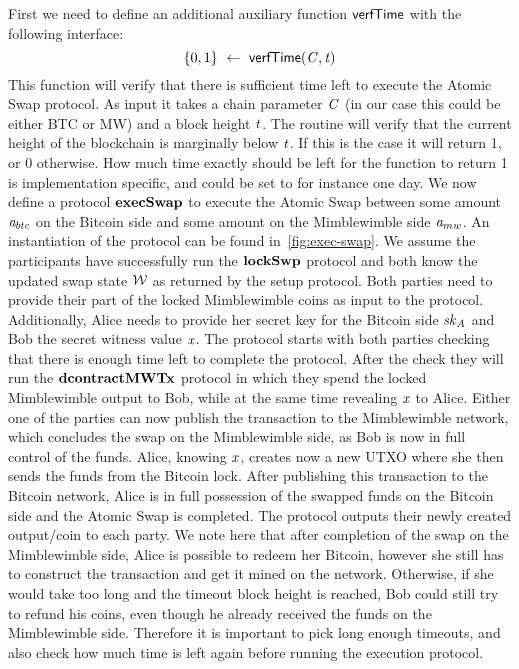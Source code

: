 First we need to define an additional auxiliary function $\mathsf{verfTime}$ with the following interface:
\[ \{0,1\} ~\leftarrow~ \mathsf{verfTime} (\mathit{C},\mathit{t}) \]
This function will verify that there is sufficient time left to execute the Atomic Swap protocol.
As input it takes a chain parameter $\mathit{C}$ (in our case this could be either BTC or MW) and a block height $\mathit{t}$.
The routine will verify that the current height of the blockchain is marginally below $\mathit{t}$.
If this is the case it will return 1, or 0 otherwise.
How much time exactly should be left for the function to return 1 is implementation specific, and could be set to for instance one day.
We now define a protocol $\mathbf{execSwap}$ to execute the Atomic Swap between some amount $\mathit{a}_{btc}$ on the Bitcoin side and some amount on the Mimblewimble side $\mathit{a}_{mw}$.
An instantiation of the protocol can be found in~\cref{fig:exec-swap}.
We assume the participants have successfully run the $\mathbf{lockSwp}$ protocol and both know the updated swap state $\mathcal{W}$ as returned by the setup protocol.
Both parties need to provide their part of the locked Mimblewimble coins as input to the protocol.
Additionally, Alice needs to provide her secret key for the Bitcoin side $\mathit{sk}_{\mathit{A}}$ and Bob the secret witness value $\mathit{x}$.
The protocol starts with both parties checking that there is enough time left to complete the protocol.
After the check they will run the $\mathbf{dcontractMWTx}$ protocol in which they spend the locked Mimblewimble output to Bob, while at the same time revealing $\mathit{x}$ to Alice.
Either one of the parties can now publish the transaction to the Mimblewimble network, which concludes the swap on the Mimblewimble side, as Bob is now in full control of the funds.
Alice, knowing $\mathit{x}$, creates now a new UTXO where she then sends the funds from the Bitcoin lock.
After publishing this transaction to the Bitcoin network, Alice is in full possession of the swapped funds on the Bitcoin side and the Atomic Swap is completed.
The protocol outputs their newly created output/coin to each party.
We note here that after completion of the swap on the Mimblewimble side, Alice is possible to redeem her Bitcoin, however she still has to construct the transaction and get it mined on the network.
Otherwise, if she would take too long and the timeout block height is reached, Bob could still try to refund his coins, even though he already received the funds on the Mimblewimble side.
Therefore it is important to pick long enough timeouts, and also check how much time is left again before running the execution protocol.

